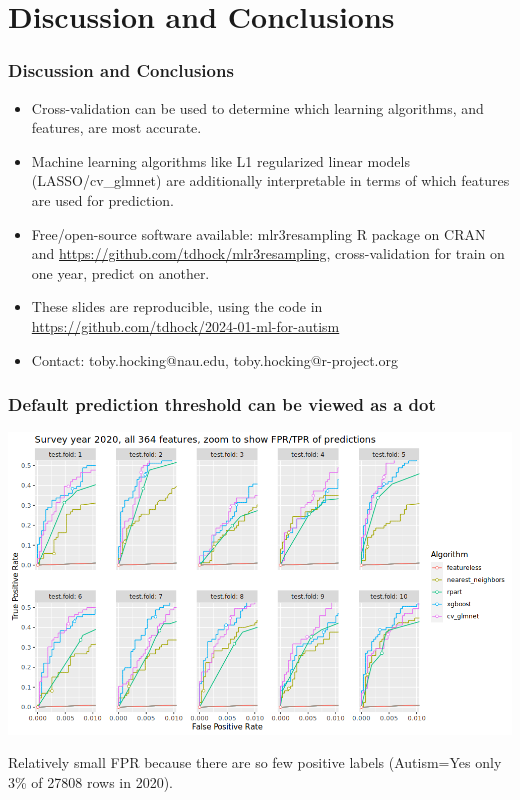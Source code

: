 \documentclass{beamer}
\begin{document}
\section{Discussion and Conclusions}

\begin{frame}
  \frametitle{Discussion and Conclusions}
  \begin{itemize}
  \item Cross-validation can be used to determine which learning
    algorithms, and features, are most accurate.
  \item Machine learning algorithms like L1 regularized linear models
    (LASSO/cv\_glmnet) are additionally interpretable in terms of
    which features are used for prediction.
  \item Free/open-source software available: mlr3resampling R package
    on CRAN and \url{https://github.com/tdhock/mlr3resampling},
    cross-validation for train on one year, predict on another.
\item These slides are reproducible, using the code in \url{https://github.com/tdhock/2024-01-ml-for-autism}
  \item Contact: toby.hocking@nau.edu,
    toby.hocking@r-project.org
  \end{itemize}
\end{frame}

\begin{frame}
  \frametitle{Default prediction threshold can be viewed as a dot}
  \includegraphics[width=\textwidth]{download-nsch-mlr3batchmark-registry-one-set-all-features-roc-zoom.png}

  Relatively small FPR because there are so few positive labels
  (Autism=Yes only 3\% of 27808 rows in 2020).
\end{frame}
\end{document}
